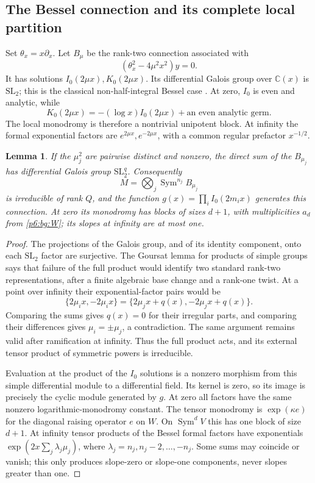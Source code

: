 \documentclass[11pt,a4paper]{article}
\newtheorem{lemma}[theorem]{Lemma}
\theoremstyle{definition}
\theoremstyle{remark}
\numberwithin{equation}{section}
\begin{document}
\subsection{The Bessel connection and its complete local partition}

Set $\theta_x=x\partial_x$.  Let $B_\mu$ be the rank-two connection
associated with
\begin{equation}\label{p6:bg:Bessel}
 (\theta_x^2-4\mu^2x^2)y=0.
\end{equation}
It has solutions $I_0(2\mu x),K_0(2\mu x)$.
Its differential Galois group over $\mathbb C(x)$ is
$\mathrm{SL}_2$; this is the classical non-half-integral Bessel
case \cite{p5:BG_Kolchin1968,p5:BG_vdPS2003}.  At zero, $I_0$ is even and analytic, while
\[
 K_0(2\mu x)=-(\log x)I_0(2\mu x)+\text{an even analytic germ}.
\]
The local monodromy is therefore a nontrivial unipotent block.
At infinity the formal exponential factors are
$e^{2\mu x},e^{-2\mu x}$, with a common regular prefactor
$x^{-1/2}$.

\begin{lemma}\label{p6:bg:galois}
If the $\mu_j^2$ are pairwise distinct and nonzero, the direct sum
of the $B_{\mu_j}$ has differential Galois group
$\mathrm{SL}_2^q$.  Consequently
\[
 M=\bigotimes_j\operatorname{Sym}^{n_j}B_{\mu_j}
\]
is irreducible of rank $Q$, and the function
$g(x)=\prod_i I_0(2m_i x)$ generates this connection.
At zero its monodromy has blocks of sizes $d+1$, with multiplicities
$a_d$ from \eqref{p6:bg:W}; its slopes at infinity are at most one.
\end{lemma}
\begin{proof}
The projections of the Galois group, and of its identity component,
onto each $\mathrm{SL}_2$ factor are surjective.  The Goursat
lemma for products of simple groups \cite[Proposition 1.8.2]{p5:BG_Katz1990} says that failure of the full
product would identify two standard rank-two representations,
after a finite algebraic base change and a rank-one twist.
At a point over infinity their exponential-factor pairs would be
\[
 \{2\mu_i x,-2\mu_i x\}
       =\{2\mu_jx+q(x),-2\mu_jx+q(x)\}.
\]
Comparing the sums gives $q(x)=0$ for their irregular parts, and
comparing their differences gives $\mu_i=\pm\mu_j$, a contradiction.
The same argument remains valid after ramification at infinity.
Thus the full product acts, and its external tensor product of
symmetric powers is irreducible.

Evaluation at the product of the $I_0$ solutions is a nonzero
morphism from this simple differential module to a differential
field.  Its kernel is zero, so its image is precisely the cyclic
module generated by $g$.  At zero all factors have the same
nonzero logarithmic-monodromy constant.  The tensor monodromy is
$\exp(\kappa e)$ for the diagonal raising operator $e$ on $W$.
On $\operatorname{Sym}^dV$ this has one block of size $d+1$.
At infinity tensor products of the Bessel formal factors have
exponentials $\exp(2x\sum_j\lambda_j\mu_j)$, where
$\lambda_j=n_j,n_j-2,\ldots,-n_j$.  Some sums may coincide or
vanish; this only produces slope-zero or slope-one components,
never slopes greater than one.
\end{proof}
\end{document}
